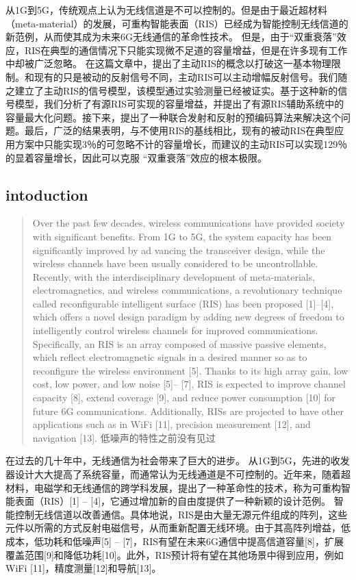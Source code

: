 \documentclass[UTF8]{ctexart}
\begin{document}
从1G到5G，传统观点上认为无线信道是不可以控制的。但是由于最近超材料（meta-material）的发展，可重构智能表面（RIS）已经成为智能控制无线信道的新范例，从而使其成为未来6G无线通信的革命性技术。
但是，由于``双重衰落''效应，RIS在典型的通信情况下只能实现微不足道的容量增益，但是在许多现有工作中却被广泛忽略。
在这篇文章中，提出了主动RIS的概念以打破这一基本物理限制。和现有的只是被动的反射信号不同，主动RIS可以主动增幅反射信号。我们随之建立了主动RIS的信号模型，该模型通过实验测量已经被证实。基于这种新的信号模型，我们分析了有源RIS可实现的容量增益，并提出了有源RIS辅助系统中的容量最大化问题。接下来，提出了一种联合发射和反射的预编码算法来解决这个问题。最后，广泛的结果表明，与不使用RIS的基线相比，现有的被动RIS在典型应用方案中只能实现3％的可忽略不计的容量增长，而建议的主动RIS可以实现129％的显着容量增长，因此可以克服
``双重衰落''效应的根本极限。

    \hypertarget{intoduction}{%
\subsection{intoduction}\label{intoduction}}

\begin{quote}
Over the past few decades, wireless communications have provided society
with significant benefits. From 1G to 5G, the system capacity has been
significantly improved by ad vancing the transceiver design, while the
wireless channels have been usually considered to be uncontrollable.
Recently, with the interdisciplinary development of meta-materials,
electromagnetics, and wireless communications, a revolutionary technique
called reconfigurable intelligent surface (RIS) has been proposed
{[}1{]}--{[}4{]}, which offers a novel design paradigm by adding new
degrees of freedom to intelligently control wireless channels for
improved communications. Specifically, an RIS is an array composed of
massive passive elements, which reflect electromagnetic signals in a
desired manner so as to reconfigure the wireless environment {[}5{]}.
Thanks to its high array gain, low cost, low power, and low noise
{[}5{]}-- {[}7{]}, RIS is expected to improve channel capacity {[}8{]},
extend coverage {[}9{]}, and reduce power consumption {[}10{]} for
future 6G communications. Additionally, RISs are projected to have other
applications such as in WiFi {[}11{]}, precision measurement {[}12{]},
and navigation {[}13{]}. 低噪声的特性之前没有见过
\end{quote}

在过去的几十年中，无线通信为社会带来了巨大的进步。
从1G到5G，先进的收发器设计大大提高了系统容量，而通常认为无线通道是不可控制的。近年来，随着超材料，电磁学和无线通信的跨学科发展，提出了一种革命性的技术，称为可重构智能表面（RIS）{[}1{]}
-- {[}4{]}，它通过增加新的自由度提供了一种新颖的设计范例。
智能控制无线信道以改善通信。具体地说，RIS是由大量无源元件组成的阵列，这些元件以所需的方式反射电磁信号，从而重新配置无线环境。由于其高阵列增益，低成本，低功耗和低噪声{[}5{]}
--
{[}7{]}，RIS有望在未来6G通信中提高信道容量{[}8{]}，扩展覆盖范围{[}9{]}和降低功耗{[}10{]}。此外，RIS预计将有望在其他场景中得到应用，例如WiFi
{[}11{]}，精度测量{[}12{]}和导航{[}13{]}。
\end{document}
